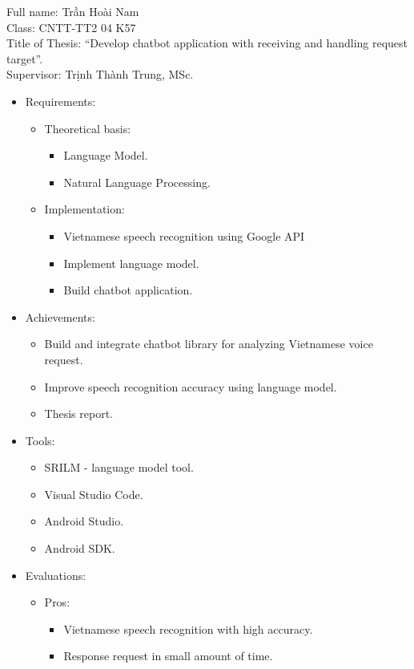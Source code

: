 \documentclass[12pt]{report}
\begin{document}
\noindent Full name: Trần Hoài Nam \\
Class: CNTT-TT2 04 K57\\
Title of Thesis: ``Develop chatbot application with receiving and handling request target''.\\
Supervisor: Trịnh Thành Trung, MSc.
\begin{itemize}
	\item Requirements:
	\begin{itemize}
		\item Theoretical basis:		
		\begin{itemize}
			\item Language Model.
			\item Natural Language Processing.
		\end{itemize}
		\item Implementation:		
		\begin{itemize}
			\item Vietnamese speech recognition using Google API
			\item Implement language model.
			\item Build chatbot application.
		\end{itemize}
	\end{itemize}
	\item Achievements:
	\begin{itemize}
		\item Build and integrate chatbot library for analyzing Vietnamese voice request.
		\item Improve speech recognition accuracy using language model.
		\item Thesis report.
	\end{itemize}
	\item Tools:
	\begin{itemize}
		\item SRILM - language model tool.
		\item Visual Studio Code.
		\item Android Studio.
		\item Android SDK.
	\end{itemize}
	\item Evaluations:
	\begin{itemize}
		\item Pros:		
		\begin{itemize}
			\item Vietnamese speech recognition with high accuracy.
			\item Response request in small amount of time.

\end{itemize}
\end{itemize}
\end{itemize}
\end{document}
